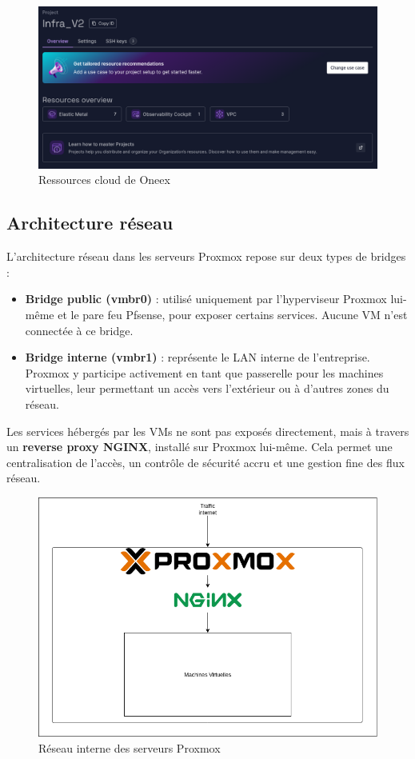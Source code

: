\begin{figure} [H]
	\centering
	\includegraphics[width=.5\textwidth]{figures/Ressources cloud.png}
	\caption{Ressources cloud de Oneex}
\end{figure}

\subsection{Architecture réseau}

L’architecture réseau dans les serveurs Proxmox repose sur deux types de bridges :

\begin{itemize}
	\item \textbf{Bridge public (vmbr0)} : utilisé uniquement par l’hyperviseur Proxmox lui-même et le pare feu Pfsense, pour exposer certains services. Aucune VM n’est connectée à ce bridge.
	\item \textbf{Bridge interne (vmbr1)} : représente le LAN interne de l’entreprise. Proxmox y participe activement en tant que passerelle pour les machines virtuelles, leur permettant un accès vers l’extérieur ou à d’autres zones du réseau.
\end{itemize}

Les services hébergés par les VMs ne sont pas exposés directement, mais à travers un \textbf{reverse proxy NGINX}, installé sur Proxmox lui-même. Cela permet une centralisation de l’accès, un contrôle de sécurité accru et une gestion fine des flux réseau.

\begin{figure} [H]
	\centering
	\includegraphics[width=.5\textwidth]{figures/Reseau inter proxmox.png}
	\caption{Réseau interne des serveurs Proxmox}
\end{figure}


